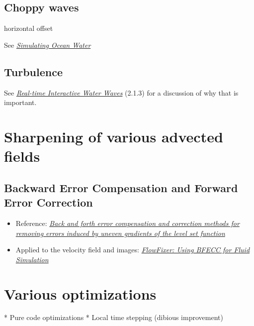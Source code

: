 \subsection{Choppy waves}

horizontal offset

See \textit{\href{http://graphics.ucsd.edu/courses/rendering/2005/jdewall/tessendorf.pdf}{Simulating Ocean Water}}

\subsection{Turbulence}

See \textit{\href{http://publications.dice.se/attachments/water\%20interaction\%20ottosson_bjorn.pdf}{Real-time Interactive Water Waves}} (2.1.3) for a discussion of why that is important.

\section{Sharpening of various advected fields}

\subsection{Backward Error Compensation and Forward Error Correction}

\begin{itemize}
    \item Reference: \textit{\href{http://smartech.gatech.edu/xmlui/bitstream/handle/1853/29473/2002-389.pdf}{Back and forth error compensation and correction methods for removing errors induced by uneven gradients of the level set function}}
    \item Applied to the velocity field and images: \textit{\href{http://www.gvu.gatech.edu/~jarek/papers/FlowFixer.pdf}{FlowFixer: Using BFECC for Fluid Simulation}}
\end{itemize}

\section{Various optimizations}

* Pure code optimizations
* Local time stepping (dibious improvement)